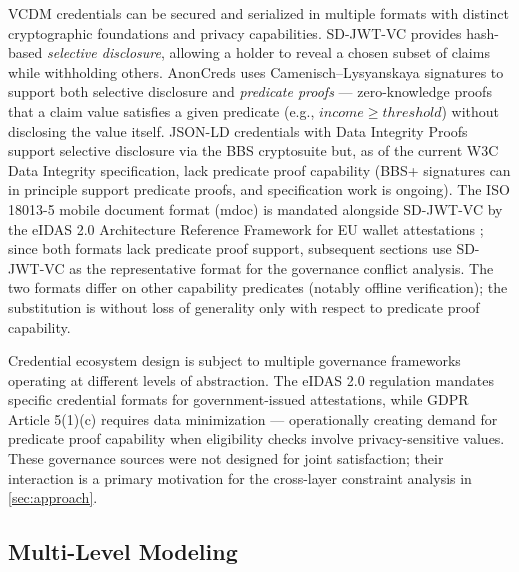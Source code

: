 VCDM credentials can be secured and serialized in multiple formats with distinct cryptographic foundations and privacy capabilities. SD-JWT-VC \citep{terbu_sd-jwt-based_2026} provides hash-based \emph{selective disclosure}, allowing a holder to reveal a chosen subset of claims while withholding others. AnonCreds \citep{curran2022anoncreds} uses Camenisch--Lysyanskaya signatures to support both selective disclosure and \emph{predicate proofs} --- zero-knowledge proofs that a claim value satisfies a given predicate (e.g., \(\mathit{income} \geq \mathit{threshold}\)) without disclosing the value itself. JSON-LD credentials with Data Integrity Proofs \citep{noauthor_verifiable_nodate} support selective disclosure via the BBS cryptosuite \citep{_bbs_2024} but, as of the current W3C Data Integrity specification, lack predicate proof capability (BBS+ signatures can in principle support predicate proofs, and specification work is ongoing). The ISO 18013-5 mobile document format (mdoc) \citep{_mobile_2021} is mandated alongside SD-JWT-VC by the eIDAS 2.0 Architecture Reference Framework for EU wallet attestations \citep{noauthor_eu-digital-identity-walleteudi-doc-architecture-and-reference-framework_2026}; since both formats lack predicate proof support, subsequent sections use SD-JWT-VC as the representative format for the governance conflict analysis. The two formats differ on other capability predicates (notably offline verification); the substitution is without loss of generality only with respect to predicate proof capability.



Credential ecosystem design is subject to multiple governance frameworks operating at different levels of abstraction. The eIDAS 2.0 regulation \citep{eidas2} mandates specific credential formats for government-issued attestations, while GDPR Article 5(1)(c) \citep{gdpr} requires data minimization --- operationally creating demand for predicate proof capability when eligibility checks involve privacy-sensitive values. These governance sources were not designed for joint satisfaction; their interaction is a primary motivation for the cross-layer constraint analysis in \autoref{sec:approach}.


\subsection{Multi-Level Modeling}\label{multi-level-modeling}

\label{sec:multi-level}

